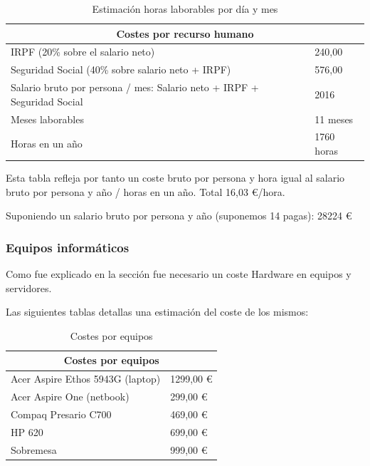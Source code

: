 \begin{table}[ht]
    \centering
    \begin{tabular}{|l|l|}
      \hline
        \multicolumn{2}{|c|}{Costes por recurso humano} \\
      \hline
       IRPF (20\% sobre el salario neto) & 240,00 \\
       Seguridad Social (40\% sobre salario neto + IRPF) & 576,00 \\
       Salario bruto por persona / mes: Salario neto + IRPF + Seguridad Social &
       2016 \\
       Meses laborables & 11 meses \\
       Horas en un año & 1760 horas \\
      \hline
    \end{tabular}
    \caption{Estimación horas laborables por día y mes}
     \label{tab:hourestimation}
\end{table}

Esta tabla refleja por tanto un coste bruto por persona y hora igual al salario
bruto por persona y año / horas en un año. Total 16,03 €/hora.

Suponiendo un salario bruto por persona y año (suponemos 14 pagas): 28224 €

\subsubsection{Equipos informáticos}

Como fue explicado en la sección \label{sec:harware} fue necesario un coste
Hardware en equipos y servidores. 

\newpage

Las siguientes tablas detallas una estimación del coste de los mismos:

\begin{table}[ht]
    \centering
    \begin{tabular}{|l|l|}
      \hline
      \multicolumn{2}{|c|}{Costes por equipos} \\
      \hline
       Acer Aspire Ethos 5943G (laptop) & 1299,00 € \\
       Acer Aspire One (netbook) & 299,00 €\\
       Compaq Presario C700 & 469,00 €\\
       HP 620 & 699,00 €\\
       Sobremesa & 999,00 €\\
       \hline
    \end{tabular}
    \caption{Costes por equipos}
     \label{tab:hwstimation}
\end{table}

